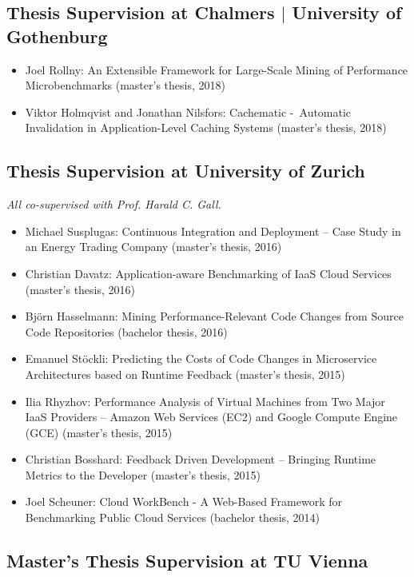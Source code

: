 \documentclass[paper=letter,fontsize=11pt]{scrartcl} %
\begin{document}
\subsection*{Thesis Supervision at Chalmers $|$ University of Gothenburg}

\begin{itemize}
	\item Joel Rollny: An Extensible Framework for Large-Scale Mining of Performance Microbenchmarks (master's thesis, 2018)
  \item Viktor Holmqvist and Jonathan Nilsfors: Cachematic - Automatic Invalidation in Application-Level Caching Systems (master's thesis, 2018)
\end{itemize}

\subsection*{Thesis Supervision at University of Zurich}

\emph{All co-supervised with Prof. Harald C. Gall.}

\begin{itemize}
  \item Michael Susplugas: Continuous Integration and Deployment -- Case Study in an Energy Trading Company (master's thesis, 2016)
	\item Christian Davatz: Application-aware Benchmarking of IaaS Cloud Services (master's thesis, 2016)
	\item Bj\"orn Hasselmann: Mining Performance-Relevant Code Changes from Source Code Repositories (bachelor thesis, 2016)
  \item Emanuel St\"ockli: Predicting the Costs of Code Changes in Microservice Architectures based on Runtime Feedback  (master's thesis, 2015)
  \item Ilia Rhyzhov: Performance Analysis of Virtual Machines from Two Major IaaS Providers -- Amazon Web Services (EC2) and Google Compute Engine (GCE)  (master's thesis, 2015)
  \item Christian Bosshard: Feedback Driven Development -- Bringing Runtime Metrics to the Developer  (master's thesis, 2015)
  \item Joel Scheuner: Cloud WorkBench - A Web-Based Framework for Benchmarking Public Cloud Services (bachelor thesis, 2014)
\end{itemize}

\subsection*{Master's Thesis Supervision at TU Vienna}
\end{document}
